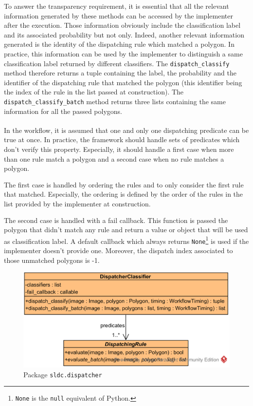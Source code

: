 To answer the transparency requirement, it is essential that all the relevant information generated by these methods can be accessed by the implementer after the execution. Those information obviously include the classification label and its associated probability but not only. Indeed, another relevant information generated is the identity of the dispatching rule which matched a polygon. In practice, this information can be used by the implementer to distinguish a same classification label returned by different classifiers. The \texttt{dispatch\_classify} method therefore returns a tuple containing the label, the probability and the identifier of the dispatching rule that matched the polygon (this identifier being the index of the rule in the list passed at construction). The \texttt{dispatch\_classify\_batch} method  returns three lists containing the same information for all the passed polygons.
\paragraph{}
In the workflow, it is assumed that one and only one dispatching predicate can be true at once. In practice, the framework should handle sets of predicates which don't verify this property. Especially, it should handle a first case when more than one rule match a polygon and a second case when no rule matches a polygon. 

The first case is handled by ordering the rules and to only consider the first rule that matched. Especially, the ordering is defined by the order of the rules in the list provided by the implementer at construction. 

The second case is handled with a fail callback. This function is passed the polygon that didn't match any rule and return a value or object that will be used as classification label. A default callback which always returns \texttt{None}\footnote{\texttt{None} is the \texttt{null} equivalent of Python.} is used if the implementer doesn't provide one.
Moreover, the dispatch index associated to those unmatched polygons is -1.


\begin{figure}
	\center
	\includegraphics[scale=0.95]{image/uml_dispatcher_classifier.png}
	\caption{Package \texttt{sldc.dispatcher}}
	\label{fig:uml_dispatcher_classifier}
\end{figure}

